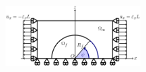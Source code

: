 \documentclass[first,firstsupp,lastsupp,last,hyperref,table]{ETHclass}
\begin{document}
\begin{frame}
\begin{columns}[c]
\begin{column}{0.5\textwidth}
\begin{figure}
\end{figure}
\end{column}
\end{columns}
\vspace{-0.3cm}
\centering
\begin{figure}
\centering
\includegraphics[width=0.45\textwidth]{refAngle.pdf}
\end{figure}
\end{frame}

\addtocounter{framenumber}{-1}
\end{document}
